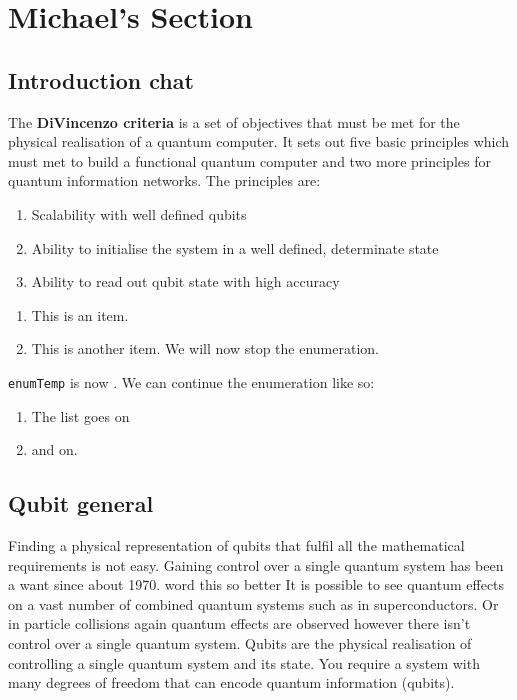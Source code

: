 \section{Michael's Section}
\subsection{Introduction chat}

The {\bf DiVincenzo criteria} is a set of objectives that must be met for the physical realisation of a quantum computer. 
It sets out five basic principles which must met to build a functional quantum computer and two more principles for quantum information networks. 
The principles are:
\begin{enumerate}
    \item Scalability with well defined qubits
    \item Ability to initialise the system in a well defined, determinate state
    \item Ability to read out qubit state with high accuracy
\end{enumerate}

\begin{enumerate}
    \item This is an item.
    \item This is another item. We will now stop the enumeration.
    \setcounter{enumTemp}{\theenumi}
\end{enumerate}
\texttt{enumTemp} is now \theenumTemp. We can continue the enumeration like so:
\begin{enumerate}
    \setcounter{enumi}{\theenumTemp}
    \item The list goes on
    \item and on.
\end{enumerate}
  
\subsection{Qubit general}
Finding a physical representation of qubits that fulfil all the mathematical requirements is not easy.
Gaining control over a single quantum system has been a want since about 1970. word this so better
It is possible to see quantum effects on a vast number of combined quantum systems such as in superconductors. \cite{nielsen_quantum_2010}
Or in particle collisions again quantum effects are observed however there isn't control over a single quantum system.
Qubits are the physical realisation of controlling a single quantum system and its state.
You require a system with many degrees of freedom that can encode quantum information (qubits). \cite{bergou_quantum_2021}

